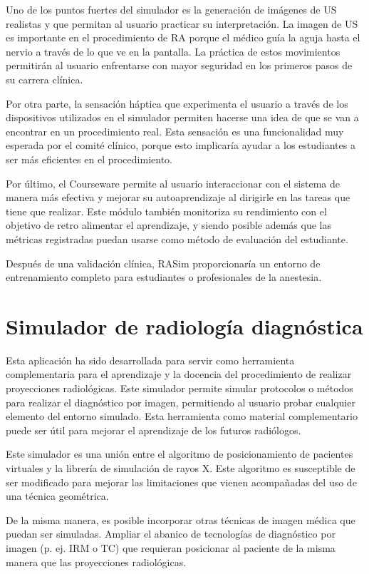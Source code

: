 Uno de los puntos fuertes del simulador es la generación de imágenes de \ac{US} realistas y que permitan al usuario practicar su interpretación. La imagen de \ac{US} es importante en el procedimiento de \ac{RA} porque el médico guía la aguja hasta el nervio a través de lo que ve en la pantalla. La práctica de estos movimientos permitirán al usuario enfrentarse con mayor seguridad en los primeros pasos de su carrera clínica. 

Por otra parte, la sensación háptica que experimenta el usuario a través de los dispositivos utilizados en el simulador permiten hacerse una idea de que se van a encontrar en un procedimiento real. Esta sensación es una funcionalidad muy esperada por el comité clínico, porque esto implicaría ayudar a los estudiantes a ser más eficientes en el procedimiento.


Por último, el \ac{Courseware} permite al usuario interaccionar con el sistema de manera más efectiva y mejorar su autoaprendizaje al dirigirle en las tareas que tiene que realizar. Este módulo también monitoriza su rendimiento con el objetivo de retro alimentar el aprendizaje, y siendo posible además que las métricas registradas puedan usarse como método de evaluación del estudiante.

Después de una validación clínica, \ac{RASim} proporcionaría un entorno de entrenamiento completo para estudiantes o profesionales de la anestesia. 




\section{Simulador de radiología diagnóstica }
\label{conclu:xray}
Esta aplicación ha sido desarrollada para servir como herramienta complementaria para el aprendizaje y la docencia del procedimiento de realizar proyecciones radiológicas. Este simulador permite simular protocolos o métodos para realizar el diagnóstico por imagen, permitiendo al usuario probar cualquier elemento del entorno simulado. Esta herramienta como material complementario puede ser útil para mejorar el aprendizaje de los futuros radiólogos.

Este simulador es una unión entre el algoritmo de posicionamiento de pacientes virtuales y la librería de simulación de rayos X. Este algoritmo es susceptible de ser modificado para mejorar las limitaciones que vienen acompañadas del uso de una técnica geométrica.  

De la misma manera, es posible incorporar otras técnicas de imagen médica que puedan ser simuladas. Ampliar el abanico de tecnologías de diagnóstico por imagen (p. ej. \ac{IRM} o \ac{TC}) que requieran posicionar al paciente de la misma manera que las proyecciones radiológicas. 





